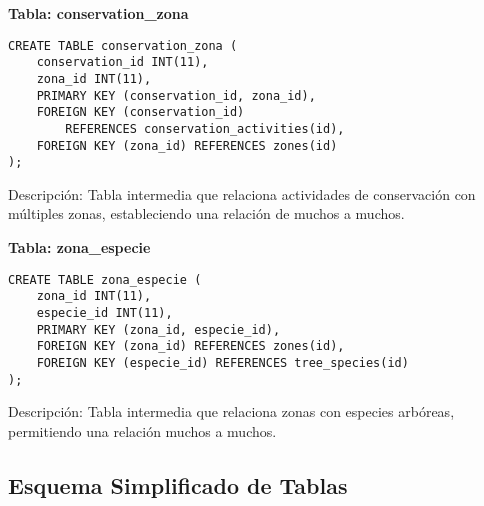 \textbf{Tabla: conservation\_zona}
\begin{verbatim}
CREATE TABLE conservation_zona (
    conservation_id INT(11),
    zona_id INT(11),
    PRIMARY KEY (conservation_id, zona_id),
    FOREIGN KEY (conservation_id) 
        REFERENCES conservation_activities(id),
    FOREIGN KEY (zona_id) REFERENCES zones(id)
);
\end{verbatim}
Descripción: Tabla intermedia que relaciona actividades de conservación con múltiples zonas, estableciendo una relación de muchos a muchos.

\textbf{Tabla: zona\_especie}
\begin{verbatim}
CREATE TABLE zona_especie (
    zona_id INT(11),
    especie_id INT(11),
    PRIMARY KEY (zona_id, especie_id),
    FOREIGN KEY (zona_id) REFERENCES zones(id),
    FOREIGN KEY (especie_id) REFERENCES tree_species(id)
);
\end{verbatim}
Descripción: Tabla intermedia que relaciona zonas con especies arbóreas, permitiendo una relación muchos a muchos.

\subsection{Esquema Simplificado de Tablas}
